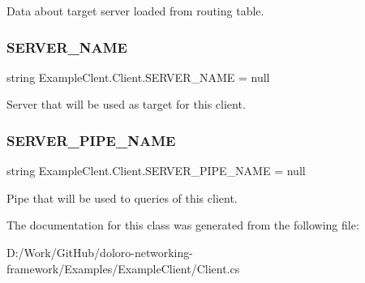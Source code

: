 Data about target server loaded from routing table. 

\mbox{\label{class_example_clent_1_1_client_aa55c8c76b8164a59b15b8aec26c8bd89}} 
\subsubsection{\texorpdfstring{S\+E\+R\+V\+E\+R\+\_\+\+N\+A\+ME}{SERVER\_NAME}}
{\footnotesize\ttfamily string Example\+Clent.\+Client.\+S\+E\+R\+V\+E\+R\+\_\+\+N\+A\+ME = null\hspace{0.3cm}{\ttfamily [static]}}



Server that will be used as target for this client. 

\mbox{\label{class_example_clent_1_1_client_ace39c387c6ea1cc5db66945775661ea6}} 
\subsubsection{\texorpdfstring{S\+E\+R\+V\+E\+R\+\_\+\+P\+I\+P\+E\+\_\+\+N\+A\+ME}{SERVER\_PIPE\_NAME}}
{\footnotesize\ttfamily string Example\+Clent.\+Client.\+S\+E\+R\+V\+E\+R\+\_\+\+P\+I\+P\+E\+\_\+\+N\+A\+ME = null\hspace{0.3cm}{\ttfamily [static]}}



Pipe that will be used to queries of this client. 



The documentation for this class was generated from the following file\+:\begin{DoxyCompactItemize}
\item 
D\+:/\+Work/\+Git\+Hub/doloro-\/networking-\/framework/\+Examples/\+Example\+Client/Client.\+cs\end{DoxyCompactItemize}
